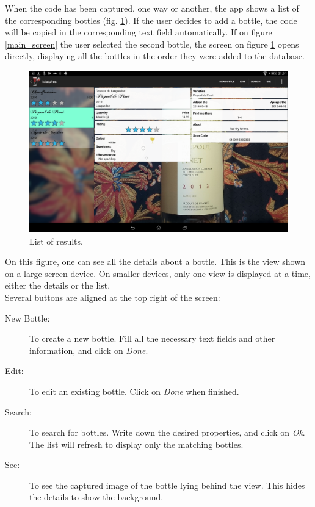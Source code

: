 When the code has been captured, one way or another, the app shows a list of the corresponding bottles (fig. \ref{list_results}). If the user decides to add a bottle, the code will be copied in the corresponding text field automatically. If on figure \ref{main_screen} the user selected the second bottle, the screen on figure \ref{list_results} opens directly, displaying all the bottles in the order they were added to the database.

\begin{figure}[H]
\begin{center}
	\includegraphics[width=\textwidth]{Images/ResultsActivity.png}
	\caption{List of results.}
	\label{list_results}
\end{center}
\end{figure}

On this figure, one can see all the details about a bottle. This is the view shown on a large screen device. On smaller devices, only one view is displayed at a time, either the details or the list.\\

Several buttons are aligned at the top right of the screen:
\begin{description}
\item[New Bottle:] To create a new bottle. Fill all the necessary text fields and other information, and click on \emph{Done}.
\item[Edit:] To edit an existing bottle. Click on \emph{Done} when finished.
\item[Search:] To search for bottles. Write down the desired properties, and click on \emph{Ok}. The list will refresh to display only the matching bottles.
\item[See:] To see the captured image of the bottle lying behind the view. This hides the details to show the background.
\end{description}

